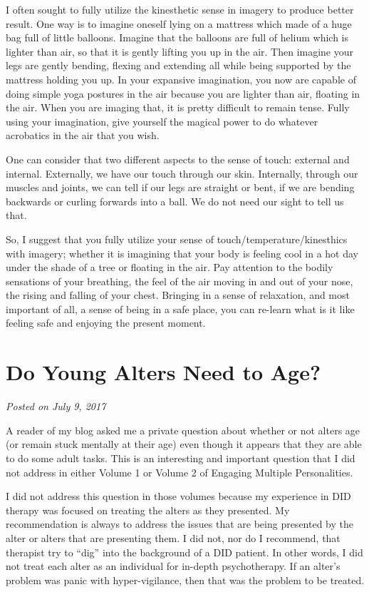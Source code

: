 \documentclass[]{book}
\begin{document}
I often sought to fully utilize the kinesthetic sense in imagery to produce better result. One way is to imagine oneself lying on a mattress which made of a huge bag full of little balloons. Imagine that the balloons are full of helium which is lighter than air, so that it is gently lifting you up in the air. Then imagine your legs are gently bending, flexing and extending all while being supported by the mattress holding you up. In your expansive imagination, you now are capable of doing simple yoga postures in the air because you are lighter than air, floating in the air. When you are imaging that, it is pretty difficult to remain tense. Fully using your imagination, give yourself the magical power to do whatever acrobatics in the air that you wish.

One can consider that two different aspects to the sense of touch: external and internal. Externally, we have our touch through our skin. Internally, through our muscles and joints, we can tell if our legs are straight or bent, if we are bending backwards or curling forwards into a ball. We do not need our sight to tell us that.

So, I suggest that you fully utilize your sense of touch/temperature/kinesthics with imagery; whether it is imagining that your body is feeling cool in a hot day under the shade of a tree or floating in the air. Pay attention to the bodily sensations of your breathing, the feel of the air moving in and out of your nose, the rising and falling of your chest. Bringing in a sense of relaxation, and most important of all, a sense of being in a safe place, you can re-learn what is it like feeling safe and enjoying the present moment.

\hypertarget{do-young-alters-need-to-age}{%
\section{Do Young Alters Need to Age?}\label{do-young-alters-need-to-age}}

\emph{Posted on July 9, 2017}

A reader of my blog asked me a private question about whether or not alters age (or remain stuck mentally at their age) even though it appears that they are able to do some adult tasks. This is an interesting and important question that I did not address in either Volume 1 or Volume 2 of Engaging Multiple Personalities.

I did not address this question in those volumes because my experience in DID therapy was focused on treating the alters as they presented. My recommendation is always to address the issues that are being presented by the alter or alters that are presenting them. I did not, nor do I recommend, that therapist try to ``dig'' into the background of a DID patient. In other words, I did not treat each alter as an individual for in-depth psychotherapy. If an alter's problem was panic with hyper-vigilance, then that was the problem to be treated.
\end{document}
